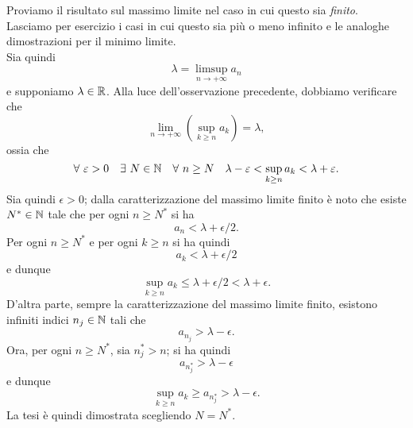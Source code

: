 \begin{demonstrationwt}
	Proviamo il risultato sul massimo limite nel caso in cui questo sia \textit{finito}. Lasciamo per esercizio i casi in cui questo sia più o meno infinito e le analoghe dimostrazioni per il minimo limite.\\
	Sia quindi 
	\begin{equation*}
		\lambda = \limsup_{n\to +\infty} a_n
	\end{equation*}
	e supponiamo $\lambda \in \mathbb{R}$. Alla luce dell'osservazione precedente, dobbiamo verificare che 
	\begin{equation*}
		\lim_{n\to +\infty} \left( \sup_{k\geq n} a_k\right) = \lambda,
	\end{equation*}
	ossia che 
	\begin{equation*}
		\forall \ \varepsilon >0 \quad \exists \ N\in \mathbb{N}\quad \forall \ n\geq N \quad \lambda -\varepsilon < \sup_{k\geq n} a_k <\lambda +\varepsilon.
	\end{equation*}
	Sia quindi $\epsilon >0$; dalla caratterizzazione del massimo limite finito è noto che esiste $N^{\ast}\in \mathbb{N}$ tale che per ogni $n\geq N^{\ast}$ si ha 
	\begin{equation*}
		a_n < \lambda +\epsilon/2.
	\end{equation*}
	Per ogni $n \geq N^{\ast}$ e per ogni $k\geq n$ si ha quindi
	\begin{equation*}
		a_k < \lambda +\epsilon/2
	\end{equation*}
	e dunque
	\begin{equation*}
		\sup_{k\geq n} a_k \leq \lambda +\epsilon/2 < \lambda +\epsilon.
	\end{equation*}
	D'altra parte, sempre la caratterizzazione del massimo limite finito, esistono infiniti indici $n_j\in \mathbb{N}$ tali che
	\begin{equation*}
	a_{n_j} > \lambda -\epsilon.
	\end{equation*}
	Ora, per ogni $n\geq N^{\ast}$, sia $n^{\ast}_j>n$; si ha quindi
	\begin{equation*}
		a_{n^{\ast}_j} > \lambda -\epsilon
	\end{equation*}
	e dunque
	\begin{equation*}
		\sup_{k\geq n} a_{k} \geq a_{n^{\ast}_j}  > \lambda -\epsilon.
	\end{equation*}
	La tesi è quindi dimostrata scegliendo $N=N^{\ast}$.
\end{demonstrationwt}
